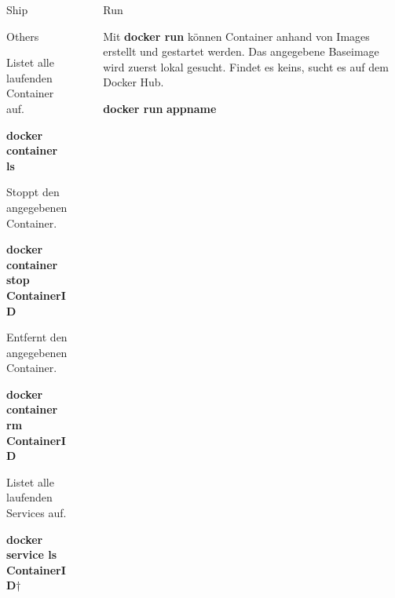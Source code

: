 \documentclass[final]{beamer}
\newlength{\sepwid}
\newlength{\specialcolwid}
\begin{document}
\begin{frame}
\begin{columns}[t]
\begin{column}{\specialcolwid}
\begin{block}{Ship}
\end{block}

\begin{block}{Others}

\par Listet alle laufenden Container auf.
\par \textbf{docker container ls}

\vspace{1cm}
\par Stoppt den angegebenen Container.
\par \par \textbf{docker container stop} \textcolor{docker-lb}{\textbf{ContainerID}}

\vspace{1cm}
\par Entfernt den angegebenen Container.
\par \par \textbf{docker container rm} \textcolor{docker-lb}{\textbf{ContainerID}}

\vspace{1cm}
\par Listet alle laufenden Services auf.
\par \par \textbf{docker service ls} \textcolor{docker-lb}{\textbf{ContainerID}}†

\end{block}

\end{column} %

\begin{column}{\sepwid}\end{column} %

\begin{column}{\specialcolwid} %

\begin{block}{Run}

\par Mit \textbf{docker run} können Container anhand von Images erstellt und gestartet werden. Das angegebene Baseimage wird zuerst lokal gesucht. Findet es keins, sucht es auf dem Docker Hub.
\vspace{1cm}


\par \textbf{docker run} \textcolor{docker-pu}{} \textcolor{docker-lb}{\textbf{appname}}
\vspace{1cm}


\end{block}
\end{column}
\end{columns}
\end{frame}
\end{document}

